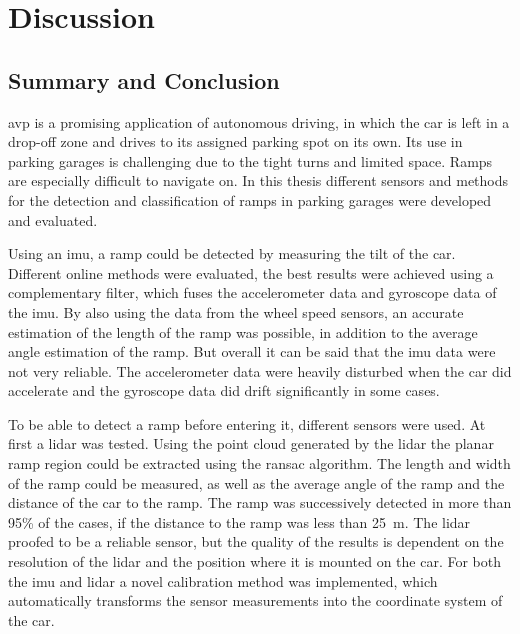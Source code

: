 \chapter{Discussion}
\label{ch:Conclusion}

\section{Summary and Conclusion}
\gls{avp} is a promising application of autonomous driving, in which the car is left in a drop-off zone and drives to its assigned parking spot on its own.
Its use in parking garages is challenging due to the tight turns and limited space.
Ramps are especially difficult to navigate on.
In this thesis different sensors and methods for the detection and classification of ramps in parking garages were developed and evaluated.

Using an \gls{imu}, a ramp could be detected by measuring the tilt of the car.
Different online methods were evaluated, the best results were achieved using a complementary filter, which fuses the accelerometer data and gyroscope data of the \gls{imu}.
By also using the data from the wheel speed sensors, an accurate estimation of the length of the ramp was possible, in addition to the average angle estimation of the ramp.
But overall it can be said that the \gls{imu} data were not very reliable.
The accelerometer data were heavily disturbed when the car did accelerate and the gyroscope data did drift significantly in some cases.

To be able to detect a ramp before entering it, different sensors were used.
At first a \gls{lidar} was tested.
Using the point cloud generated by the \gls{lidar} the planar ramp region could be extracted using the \gls{ransac} algorithm.
The length and width of the ramp could be measured, as well as the average angle of the ramp and the distance of the car to the ramp.
The ramp was successively detected in more than 95\% of the cases, if the distance to the ramp was less than \SI{25}{\metre}.
The \gls{lidar} proofed to be a reliable sensor, but the quality of the results is dependent on the resolution of the \gls{lidar} and the position where it is mounted on the car.
For both the \gls{imu} and \gls{lidar} a novel calibration method was implemented, which automatically transforms the sensor measurements into the coordinate system of the car.

